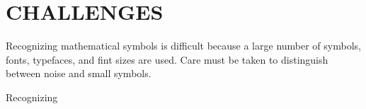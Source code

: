 \section{CHALLENGES}
\par
Recognizing mathematical symbols is difficult because a large number of symbols, fonts, typefaces, and fint sizes are used. Care must be taken to distinguish between noise and small symbols.
\par
Recognizing 